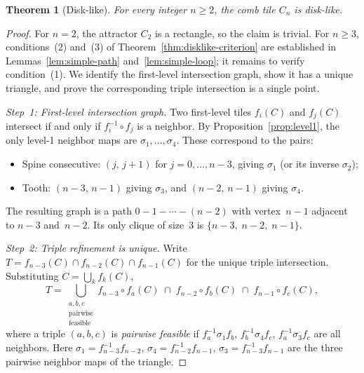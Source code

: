 \documentclass{amsart}
\newtheorem{theorem}{Theorem}[section]
\theoremstyle{definition}
\theoremstyle{remark}
\begin{document}
\begin{theorem}[Disk-like]\label{thm:disklike}
For every integer $n \ge 2$, the comb tile $C_n$ is disk-like.
\end{theorem}

\begin{proof}
For $n = 2$, the attractor $C_2$ is a rectangle, so the claim is
trivial.  For $n \ge 3$, conditions~(2) and~(3) of
Theorem~\ref{thm:disklike-criterion} are established in
Lemmas~\ref{lem:simple-path} and~\ref{lem:simple-loop}; it remains to
verify condition~(1).  We identify the first-level intersection graph,
show it has a unique triangle, and prove the corresponding triple
intersection is a single point.

\emph{Step~1: First-level intersection graph.}
Two first-level tiles $f_i(C)$ and $f_j(C)$ intersect if and only if
$f_i^{-1} \circ f_j$ is a neighbor.
By Proposition~\ref{prop:level1}, the only level-1 neighbor maps are
$\sigma_1, \ldots, \sigma_4$.  These correspond to the pairs:
\begin{itemize}
\item Spine consecutive: $(j,\, j{+}1)$ for $j = 0, \ldots, n{-}3$,
  giving $\sigma_1$ (or its inverse $\sigma_2$);
\item Tooth: $(n{-}3,\, n{-}1)$ giving $\sigma_3$, and
  $(n{-}2,\, n{-}1)$ giving $\sigma_4$.
\end{itemize}
The resulting graph is a path $0 {-} 1 {-} \cdots {-} (n{-}2)$ with
vertex~$n{-}1$ adjacent to $n{-}3$ and~$n{-}2$.  Its only clique of
size~$3$ is $\{n{-}3,\; n{-}2,\; n{-}1\}$.

\emph{Step~2: Triple refinement is unique.}
Write $T = f_{n-3}(C) \cap f_{n-2}(C) \cap f_{n-1}(C)$ for the
unique triple intersection.  Substituting $C = \bigcup_k f_k(C)$,
\[
  T = \bigcup_{\substack{a,b,c \\ \text{pairwise}\\\text{feasible}}}
  f_{n-3} \circ f_a(C) \;\cap\;
  f_{n-2} \circ f_b(C) \;\cap\;
  f_{n-1} \circ f_c(C),
\]
where a triple $(a, b, c)$ is \emph{pairwise feasible} if
$f_a^{-1} \sigma_1 f_b$,\; $f_b^{-1} \sigma_4 f_c$,\;
$f_a^{-1} \sigma_3 f_c$ are all neighbors.
Here $\sigma_1 = f_{n-3}^{-1} f_{n-2}$,
$\sigma_4 = f_{n-2}^{-1} f_{n-1}$,
$\sigma_3 = f_{n-3}^{-1} f_{n-1}$ are the three pairwise neighbor
maps of the triangle.


\end{proof}
\end{document}
